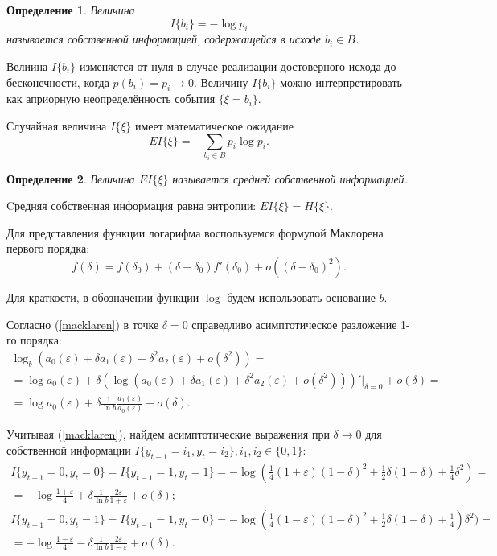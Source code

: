 ﻿\documentclass[a4paper,12pt]{article}
\theoremstyle{plain}
\newtheorem{definition}{Определение}[section]
\begin{document}
\begin{definition} \cite{duhin} 
	Величина 
	\begin{equation}\label{own:information}I\{b_i\}=-\log p_i
	\end{equation}
	называется собственной информацией, содержащейся в исходе $b_i \in B$. 
\end{definition}
Велиина $I\{b_i\}$ изменяется от нуля в случае
реализации достоверного исхода до бесконечности, когда $p(b_i)=p_i\rightarrow 0$.
Величину $I\{b_i\}$ можно интерпретировать как априорную неопределённость события $\{\xi=b_i\}$.

Случайная величина $I\{\xi\}$ имеет математическое ожидание
\begin{equation}
	EI\{\xi\}=-\sum_{b_i \in B}p_i\log p_i.
\end{equation}

\begin{definition}
	Величина $EI\{\xi\}$ называется средней собственной информацией.
\end{definition}
Cредняя собственная информация равна энтропии: $EI\{\xi\}=H\{\xi\}$.

Для представления функции логарифма воспользуемся формулой Маклорена первого порядка:
\begin{equation}\label{macklaren}
	f(\delta)=f(\delta_0)+(\delta-\delta_0)f'(\delta_0)+o((\delta-\delta_0)^2).
\end{equation}

Для краткости, в обозначении функции $\log$ будем использовать основание $b$. 

Согласно (\ref{macklaren}) в точке $\delta=0$ справедливо асимптотическое разложение 1-го порядка:
\begin{gather*}
	\log_b(a_0(\varepsilon)+\delta a_1(\varepsilon) + \delta^2 a_2(\varepsilon) + o(\delta^2)) = \\ =
	\log a_0(\varepsilon)+\delta \left(\log(a_0(\varepsilon)+\delta a_1(\varepsilon) + \delta^2 a_2(\varepsilon) + o(\delta^2))\right)'|_{\delta=0} + o(\delta)= \\=
	\log a_0(\varepsilon) +\delta \frac{1}{\ln b}\frac{a_1(\varepsilon)}{a_0(\varepsilon)}+o(\delta).
\end{gather*}

Учитывая (\ref{macklaren}), найдем асимптотические выражения при $\delta \rightarrow 0$ для собственной информации $I\{y_{t-1}=i_1, y_t = i_2 \}, i_1,i_2 \in \{0,1\}$:
\begin{gather*}
	I\{y_{t-1}=0, y_t = 0 \}=I\{y_{t-1}=1, y_t = 1 \}= -\log(\frac{1}{4}(1+\varepsilon)(1-\delta)^2+\frac{1}{2}\delta(1-\delta)+\frac{1}{4}\delta^2) =\\=
	-\log \frac{1+\varepsilon}{4} + \delta \frac{1}{\ln b}\frac{2\varepsilon}{1+\varepsilon} + o(\delta);
	\\
	I\{y_{t-1}=0, y_t = 1 \}=I\{y_{t-1}=1, y_t = 0 \}= -\log(\frac{1}{4}(1-\varepsilon)(1-\delta)^2+\frac{1}{2}\delta(1-\delta)+\frac{1}{4})\delta^2) =\\= 
	-\log \frac{1-\varepsilon}{4} - \delta \frac{1}{\ln b}\frac{2\varepsilon}{1-\varepsilon} + o(\delta).
\end{gather*}
\end{document}
